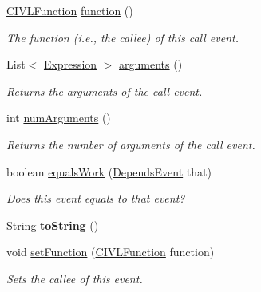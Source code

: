 \begin{DoxyCompactItemize}
\item 
\hyperlink{interfaceedu_1_1udel_1_1cis_1_1vsl_1_1civl_1_1model_1_1IF_1_1CIVLFunction}{C\+I\+V\+L\+Function} \hyperlink{classedu_1_1udel_1_1cis_1_1vsl_1_1civl_1_1model_1_1common_1_1contract_1_1CommonCallEvent_ab72b0730f367a616acf476ce48a673d4}{function} ()
\begin{DoxyCompactList}\small\item\em The function (i.\+e., the callee) of this call event. \end{DoxyCompactList}\item 
List$<$ \hyperlink{interfaceedu_1_1udel_1_1cis_1_1vsl_1_1civl_1_1model_1_1IF_1_1expression_1_1Expression}{Expression} $>$ \hyperlink{classedu_1_1udel_1_1cis_1_1vsl_1_1civl_1_1model_1_1common_1_1contract_1_1CommonCallEvent_ac7bc706f8a5b457848bcc80763fd484a}{arguments} ()
\begin{DoxyCompactList}\small\item\em Returns the arguments of the call event. \end{DoxyCompactList}\item 
int \hyperlink{classedu_1_1udel_1_1cis_1_1vsl_1_1civl_1_1model_1_1common_1_1contract_1_1CommonCallEvent_a24fb538e3465274a49a16351b9cf3fe5}{num\+Arguments} ()
\begin{DoxyCompactList}\small\item\em Returns the number of arguments of the call event. \end{DoxyCompactList}\item 
boolean \hyperlink{classedu_1_1udel_1_1cis_1_1vsl_1_1civl_1_1model_1_1common_1_1contract_1_1CommonCallEvent_a711b95ca27223e675ed31afd028fadfa}{equals\+Work} (\hyperlink{interfaceedu_1_1udel_1_1cis_1_1vsl_1_1civl_1_1model_1_1IF_1_1contract_1_1DependsEvent}{Depends\+Event} that)
\begin{DoxyCompactList}\small\item\em Does this event equals to that event? \end{DoxyCompactList}\item 
\hypertarget{classedu_1_1udel_1_1cis_1_1vsl_1_1civl_1_1model_1_1common_1_1contract_1_1CommonCallEvent_a0b79865fca369970c1160f8ecaec2453}{}String {\bfseries to\+String} ()\label{classedu_1_1udel_1_1cis_1_1vsl_1_1civl_1_1model_1_1common_1_1contract_1_1CommonCallEvent_a0b79865fca369970c1160f8ecaec2453}

\item 
void \hyperlink{classedu_1_1udel_1_1cis_1_1vsl_1_1civl_1_1model_1_1common_1_1contract_1_1CommonCallEvent_aea47e770393b839073da5ea6860eb4b3}{set\+Function} (\hyperlink{interfaceedu_1_1udel_1_1cis_1_1vsl_1_1civl_1_1model_1_1IF_1_1CIVLFunction}{C\+I\+V\+L\+Function} function)
\begin{DoxyCompactList}\small\item\em Sets the callee of this event. \end{DoxyCompactList}\end{DoxyCompactItemize}


